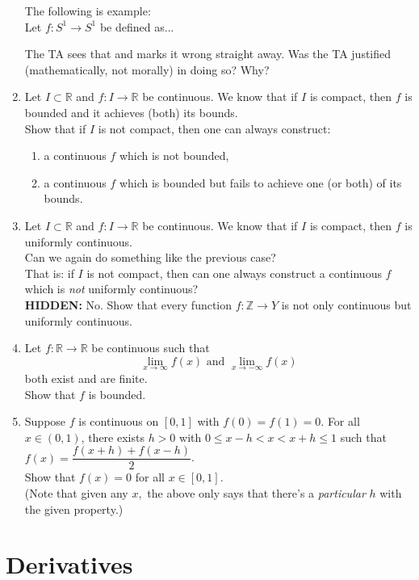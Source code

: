 \documentclass[12pt]{article}
\theoremstyle{definition}
\numberwithin{thm}{section}
\newcommand{\hint}[1]{\textbf{HIDDEN:} {\color[rgb]{0.95, 0.95, 0.95}#1}}
\newenvironment{blockquote}
{\begin{mdframed}[skipabove=0pt, skipbelow=0pt, innertopmargin=4pt, innerbottommargin=4pt, bottomline=false,topline=false,rightline=false, linewidth=2pt]}
{\end{mdframed}}
\begin{document}
\begin{enumerate}
	\begin{blockquote}
		The following is example:\\
		Let $f:S^1 \to S^1$ be defined as...
	\end{blockquote}
	The TA sees that and marks it wrong straight away. Was the TA justified (mathematically, not morally) in doing so? Why?
	\item Let $I \subset \mathbb{R}$ and $f:I \to \mathbb{R}$ be continuous. We know that if $I$ is compact, then $f$ is bounded and it achieves (both) its bounds.\\
	Show that if $I$ is not compact, then one can always construct:
	\begin{enumerate}
		\item a continuous $f$ which is not bounded,
		\item a continuous $f$ which is bounded but fails to achieve one (or both) of its bounds.
	\end{enumerate}
	\item Let $I \subset \mathbb{R}$ and $f:I \to \mathbb{R}$ be continuous. We know that if $I$ is compact, then $f$ is uniformly continuous.\\
	Can we again do something like the previous case?\\
	That is: if $I$ is not compact, then can one always construct a continuous $f$ which is \emph{not} uniformly continuous?\\
	\hint{No. Show that every function $f:\mathbb{Z} \to Y$ is not only continuous but uniformly continuous.}
	\item Let $f:\mathbb{R} \to \mathbb{R}$ be continuous such that
	\begin{equation*} 
		\lim_{x\to \infty}f(x) \text{ and } \lim_{x\to -\infty}f(x)
	\end{equation*}
	both exist and are finite.\\
	Show that $f$ is bounded.
	\item Suppose $f$ is continuous on $[0, 1]$ with $f(0) = f(1) = 0.$ For all $x\in (0, 1)$, there exists $h > 0$ with $0 \le x-h < x < x+h \le 1$ such that  $f(x)=\dfrac{f(x+h)+f(x-h)}{2}$. \\
	Show that $f(x)=0$ for all $x \in [0, 1].$\\
	(Note that given any $x,$ the above only says that there's a \emph{particular} $h$ with the given property.)
\end{enumerate}
\newpage\section{Derivatives}
\end{document}
